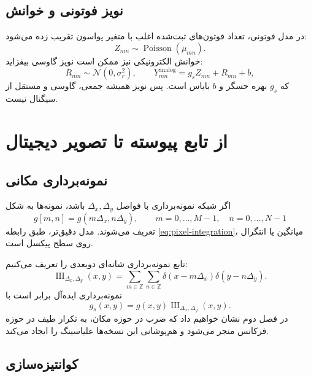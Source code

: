 \documentclass[12pt,openany,oneside]{book}
\begin{document}
\subsection{نویز فوتونی و خوانش}

در مدل فوتونی، تعداد فوتون‌های ثبت‌شده اغلب با متغیر پواسون تقریب زده می‌شود:
\begin{equation}
Z_{mn}\sim\operatorname{Poisson}(\mu_{mn}).
\end{equation}
خوانش الکترونیکی نیز ممکن است نویز گاوسی بیفزاید:
\begin{equation}
R_{mn}\sim\mathcal N(0,\sigma_r^2),
\qquad Y_{mn}^{\mathrm{analog}}=g_s Z_{mn}+R_{mn}+b,
\end{equation}
که \(g_s\) بهره حسگر و \(b\) بایاس است. پس نویز همیشه جمعی، گاوسی و مستقل از سیگنال نیست.

\section{از تابع پیوسته تا تصویر دیجیتال}

\subsection{نمونه‌برداری مکانی}

اگر شبکه نمونه‌برداری با فواصل \(\Delta_x,\Delta_y\) باشد، نمونه‌ها به شکل
\begin{equation}
g[m,n]=g(m\Delta_x,n\Delta_y),
\qquad m=0,\dots,M-1,\quad n=0,\dots,N-1
\end{equation}
تعریف می‌شوند. مدل دقیق‌تر، طبق رابطه \eqref{eq:pixel-integration}، میانگین یا انتگرال روی سطح پیکسل است.

تابع نمونه‌برداری شانه‌ای دوبعدی را تعریف می‌کنیم:
\begin{equation}
\operatorname{III}_{\Delta_x,\Delta_y}(x,y)
=\sum_{m\in\mathbb Z}\sum_{n\in\mathbb Z}
\delta(x-m\Delta_x)\delta(y-n\Delta_y).
\end{equation}
نمونه‌برداری ایده‌آل برابر است با
\begin{equation}
g_s(x,y)=g(x,y)\operatorname{III}_{\Delta_x,\Delta_y}(x,y).
\end{equation}
در فصل دوم نشان خواهیم داد که ضرب در حوزه مکان، به تکرار طیف در حوزه فرکانس منجر می‌شود
و هم‌پوشانی این نسخه‌ها علیاسینگ را ایجاد می‌کند.

\subsection{کوانتیزه‌سازی}
\end{document}
